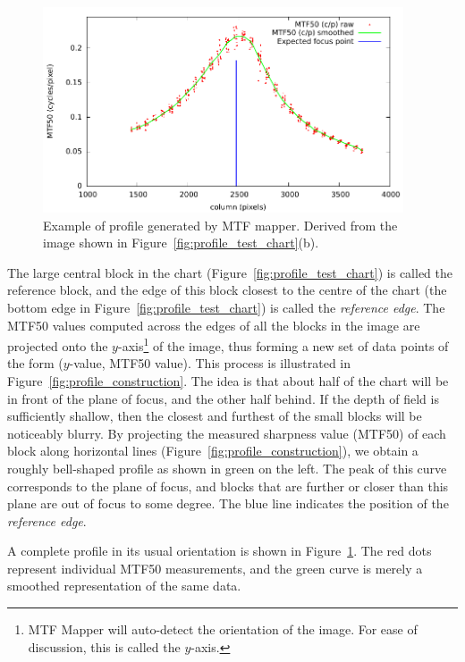 \documentclass[a4paper]{article}
\begin{document}
\begin{figure}
\centering
\includegraphics[width=0.95\textwidth]{figures/sample_profile}
\caption{Example of profile generated by MTF mapper. Derived from the image
shown in Figure~\ref{fig:profile_test_chart}(b).}
\label{fig:sample_profile}
\end{figure}

The large central block in the chart (Figure~\ref{fig:profile_test_chart}) 
is called the reference block, and the edge of this block closest to the
centre of the chart (the bottom edge in Figure~\ref{fig:profile_test_chart})
is called the \emph{reference edge}.
The MTF50 values computed across the edges of all the blocks in the image
are projected onto the $y$-axis\footnote{MTF Mapper will auto-detect the
orientation of the image. For ease of discussion, this is called the
$y$-axis.} of the image, thus forming a new set of data
points of the form ($y$-value, MTF50 value). This process is illustrated in
Figure~\ref{fig:profile_construction}. The idea is that about half of the
chart will be in front of the plane of focus, and the other half behind. If
the depth of field is sufficiently shallow, then the closest and furthest of
the small blocks will be noticeably blurry. By projecting the measured
sharpness value (MTF50) of each block along horizontal lines
(Figure~\ref{fig:profile_construction}), we obtain a roughly bell-shaped
profile as shown in green on the left. The peak of this curve corresponds to the plane
of focus, and blocks that are further or closer than this plane are out of
focus to some degree. The blue line indicates the position of the
\emph{reference edge}.

A complete profile in its usual orientation is shown in 
Figure~\ref{fig:sample_profile}. The red dots represent individual MTF50
measurements, and the green curve is merely a smoothed representation of the
same data.
\end{document}
